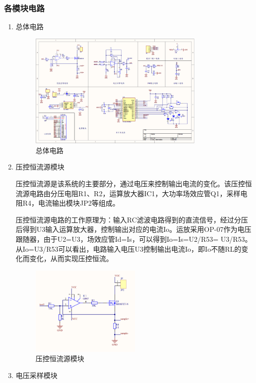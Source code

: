 \documentclass{../source/zjureport}
\begin{document}
            \subsubsection{各模块电路}
            \begin{enumerate}
                \item 总体电路
                \begin{figure}[thp]
                    \centering
                    \includegraphics[width = 0.8\textwidth]{figure/总体电路.png}
                    \caption{总体电路}
                \end{figure}
                \item 压控恒流源模块
                
                压控恒流源是该系统的主要部分，通过电压来控制输出电流的变化。该压控恒流源电路由分压电阻R1、R2，运算放大器IC1，大功率场效应管Q1，采样电阻R4，电流输出模块JP2等组成。

                压控恒流源电路的工作原理为：输入RC滤波电路得到的直流信号，经过分压后得到U3输入运算放大器，控制输出对应的电流Io。运放采用OP-07作为电压跟随器，由于U2=U3，场效应管Id=Is，可以得到Io=Is=U2/R53= U3/R53。从Io=U3/R53可以看出，电路输入电压U3控制输出电流Io，即Io不随RL的变化而变化，从而实现压控恒流。
                \newpage
                \begin{figure}[thp]
                    \centering
                    \includegraphics[width = 0.5\textwidth]{figure/压控恒流源模块.png}
                    \caption{压控恒流源模块}
                \end{figure}
                \item 电压采样模块
                

\end{enumerate}
\end{document}
